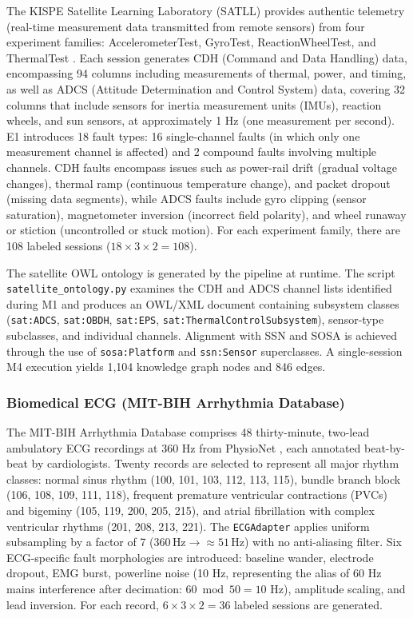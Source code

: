\documentclass[conference]{IEEEtran}
\begin{document}
The KISPE Satellite Learning Laboratory (SATLL) provides authentic telemetry (real-time measurement data transmitted from remote sensors) from four experiment families: AccelerometerTest, GyroTest, ReactionWheelTest, and ThermalTest \cite{kispe_satll}. Each session generates CDH (Command and Data Handling) data, encompassing 94 columns including measurements of thermal, power, and timing, as well as ADCS (Attitude Determination and Control System) data, covering 32 columns that include sensors for inertia measurement units (IMUs), reaction wheels, and sun sensors, at approximately 1 Hz (one measurement per second). E1 introduces 18 fault types: 16 single-channel faults (in which only one measurement channel is affected) and 2 compound faults involving multiple channels. CDH faults encompass issues such as power-rail drift (gradual voltage changes), thermal ramp (continuous temperature change), and packet dropout (missing data segments), while ADCS faults include gyro clipping (sensor saturation), magnetometer inversion (incorrect field polarity), and wheel runaway or stiction (uncontrolled or stuck motion). For each experiment family, there are 108 labeled sessions ($18 \times 3 \times 2 = 108$).

The satellite OWL ontology is generated by the pipeline at runtime. The script \texttt{satellite\_ontology.py} examines the CDH and ADCS channel lists identified during M1 and produces an OWL/XML document containing subsystem classes (\texttt{sat:ADCS}, \texttt{sat:OBDH}, \texttt{sat:EPS}, \texttt{sat:ThermalControlSubsystem}), sensor-type subclasses, and individual channels. Alignment with SSN and SOSA is achieved through the use of \texttt{sosa:Platform} and \texttt{ssn:Sensor} superclasses. A single-session M4 execution yields 1,104 knowledge graph nodes and 846 edges.

\subsubsection{Biomedical ECG (MIT-BIH Arrhythmia Database)}

The MIT-BIH Arrhythmia Database \cite{moody2001mitbih} comprises 48 thirty-minute, two-lead ambulatory ECG recordings at 360 Hz from PhysioNet \cite{goldberger2000physiobank}, each annotated beat-by-beat by cardiologists. Twenty records are selected to represent all major rhythm classes: normal sinus rhythm (100, 101, 103, 112, 113, 115), bundle branch block (106, 108, 109, 111, 118), frequent premature ventricular contractions (PVCs) and bigeminy (105, 119, 200, 205, 215), and atrial fibrillation with complex ventricular rhythms (201, 208, 213, 221). The \texttt{ECGAdapter} applies uniform subsampling by a factor of 7 ($360\,\text{Hz}\to\!\approx\!51\,\text{Hz}$) with no anti-aliasing filter. Six ECG-specific fault morphologies are introduced: baseline wander, electrode dropout, EMG burst, powerline noise (10 Hz, representing the alias of 60 Hz mains interference after decimation: $60 \bmod 50 = 10$ Hz), amplitude scaling, and lead inversion. For each record, $6 \times 3 \times 2 = 36$ labeled sessions are generated.
\end{document}

